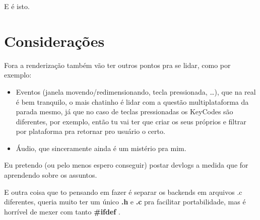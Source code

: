 \documentclass[a4paper,oneside,12pt]{article}
\newcommand{\mybox}[1]{%
    \colorbox{bg}{\textbf{#1}}
}
\begin{document}
E é isto.

\section{Considerações}

Fora a renderização também vão ter outros pontos pra se lidar, como por exemplo:

\begin{itemize}
    \item Eventos (janela movendo/redimensionando, tecla pressionada, …), que na real é bem tranquilo, o mais chatinho é lidar com a questão multiplataforma da parada mesmo, já que no caso de teclas pressionadas os KeyCodes são diferentes, por exemplo, então tu vai ter que criar os seus próprios e filtrar por plataforma pra retornar pro usuário o certo.
    \item Áudio, que sinceramente ainda é um mistério pra mim.
\end{itemize}

Eu pretendo (ou pelo menos espero conseguir) postar devlogs a medida que for aprendendo sobre os assuntos.

E outra coisa que to pensando em fazer é separar os backends em arquivos .c diferentes, queria muito ter um único \mybox{.h} e \mybox{.c} pra facilitar portabilidade, mas é horrível de mexer com tanto \mybox{\#ifdef}.
\end{document}
